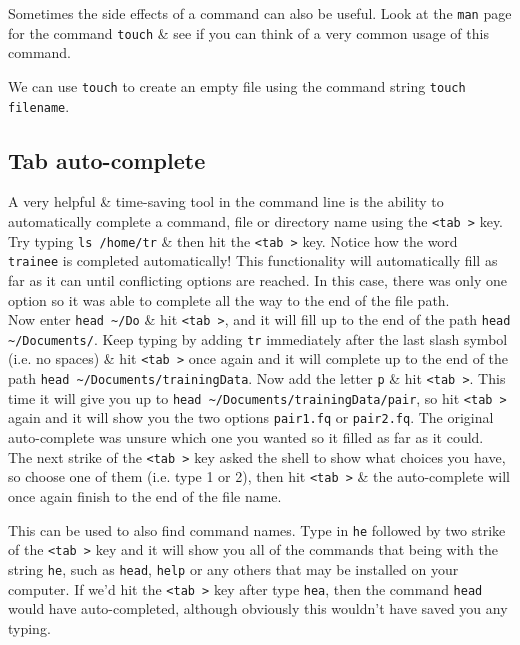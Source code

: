 \documentclass[a4paper,12pt,twoside]{memoir}
\begin{document}
\begin{bonus}
\begin{questions}
Sometimes the side effects of a command can also be useful. 
Look at the \texttt{man} page for the command \texttt{touch} \& see if you can think of a very common usage of this command. \\
\begin{answer}
We can use \texttt{touch} to create an empty file using the command string \texttt{touch filename}.
\end{answer}
\end{questions}
\end{bonus}

\subsection{Tab auto-complete}
\begin{information}
A very helpful \& time-saving tool in the command line is the ability to automatically complete a command, file or directory name using the \texttt{\textless tab \textgreater} key.
Try typing \texttt{ls /home/tr} \& then hit the \texttt{\textless tab \textgreater} key.
Notice how the word \texttt{trainee} is completed automatically!
This functionality will automatically fill as far as it can until conflicting options are reached.
In this case, there was only one option so it was able to complete all the way to the end of the file path. \\

Now enter \texttt{head \~{}/Do} \& hit \texttt{\textless tab \textgreater}, and it will fill up to the end of the path \texttt{head \~{}/Documents/}.
Keep typing by adding \texttt{tr} immediately after the last slash symbol (i.e. no spaces) \& hit \texttt{\textless tab \textgreater} once again and it will complete up to the end of the path \texttt{head \~{}/Documents/trainingData}.
Now add the letter \texttt{p} \& hit \texttt{\textless tab \textgreater}. 
This time it will give you up to \texttt{head \~{}/Documents/trainingData/pair}, so hit \texttt{\textless tab \textgreater} again and it will show you the two options \texttt{pair1.fq} or \texttt{pair2.fq}.
The original auto-complete was unsure which one you wanted so it filled as far as it could.
The next strike of the \texttt{\textless tab \textgreater} key asked the shell to show what choices you have, so choose one of them (i.e. type 1 or 2), then hit \texttt{\textless tab \textgreater} \& the auto-complete will once again finish to the end of the file name.

This can be used to also find command names.
Type in \texttt{he} followed by two strike of the \texttt{\textless tab \textgreater} key and it will show you all of the commands that being with the string \texttt{he}, such as \texttt{head}, \texttt{help} or any others that may be installed on your computer.
If we'd hit the \texttt{\textless tab \textgreater} key after type \texttt{hea}, then the command \texttt{head} would have auto-completed, although obviously this wouldn't have saved you any typing.
\end{information}
\end{document}
